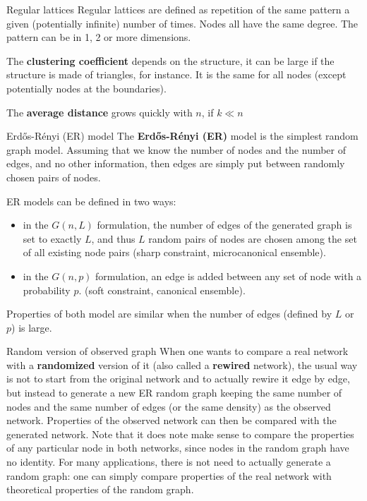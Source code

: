 \documentclass[a4paper,11pt]{book}
\begin{document}
\begin{textbox}{Regular lattices}
Regular lattices are defined as repetition of the same pattern a given (potentially infinite) number of times. Nodes all have the same degree. The pattern can be in 1, 2 or more dimensions. 

The \textbf{clustering coefficient} depends on the structure, it can be large if the structure is made of triangles, for instance. It is the same for all nodes (except potentially nodes at the boundaries).

The \textbf{average distance} grows quickly with $n$, if $k \ll n$
\end{textbox}


\begin{textbox}{Erdős-Rényi (ER) model}
The \textbf{Erdős-Rényi (ER)} model is the simplest random graph model. Assuming that we know the number of nodes and the number of edges, and no other information, then edges are simply put between randomly chosen pairs of nodes.

ER models can be defined in two ways:
\begin{itemize}
    \item in the $G(n,L)$ formulation, the number of edges of the generated graph is set to exactly $L$, and thus $L$ random pairs of nodes are chosen among the set of all existing node pairs (sharp constraint, microcanonical ensemble).
    \item in the $G(n,p)$ formulation, an edge is added between any set of node with a probability $p$. (soft constraint, canonical ensemble).
\end{itemize}

Properties of both model are similar when the number of edges (defined by $L$ or $p$) is large.

\end{textbox}








\begin{textbox}{Random version of observed graph}
When one wants to compare a real network with a \textbf{randomized} version of it (also called a \textbf{rewired} network), the usual way is not to start from the original network and to actually rewire it edge by edge, but instead to generate a new ER random graph keeping the same number of nodes and the same number of edges (or the same density) as the observed network. Properties of the observed network can then be compared with the generated network. Note that it does note make sense to compare the properties of any particular node in both networks, since nodes in the random graph have no identity. For many applications, there is not need to actually generate a random graph: one can simply compare properties of the real network with theoretical properties of the random graph.

\end{textbox}
\end{document}
